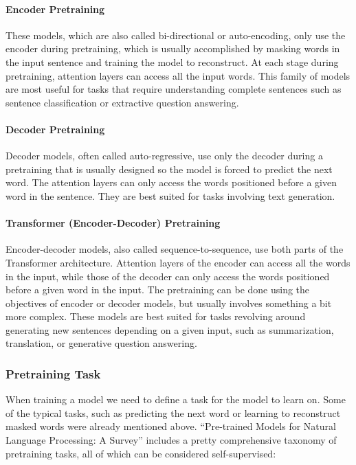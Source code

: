 \documentclass{article}
\begin{document}
\paragraph{Encoder Pretraining}

These models, which are also called bi-directional or auto-encoding, only use the encoder during pretraining, which is usually accomplished by masking words in the input sentence and training the model to reconstruct. At each stage during pretraining, attention layers can access all the input words. This family of models are most useful for tasks that require understanding complete sentences such as sentence classification or extractive question answering.

\paragraph{Decoder Pretraining}

Decoder models, often called auto-regressive, use only the decoder during a pretraining that is usually designed so the model is forced to predict the next word. The attention layers can only access the words positioned before a given word in the sentence. They are best suited for tasks involving text generation.

\paragraph{Transformer (Encoder-Decoder) Pretraining}

Encoder-decoder models, also called sequence-to-sequence, use both parts of the Transformer architecture. Attention layers of the encoder can access all the words in the input, while those of the decoder can only access the words positioned before a given word in the input. The pretraining can be done using the objectives of encoder or decoder models, but usually involves something a bit more complex. These models are best suited for tasks revolving around generating new sentences depending on a given input, such as summarization, translation, or generative question answering.

\subsubsection{Pretraining Task}

When training a model we need to define a task for the model to learn on. Some of the typical tasks, such as predicting the next word or learning to reconstruct masked words were already mentioned above. “Pre-trained Models for Natural Language Processing: A Survey”\cite{qiu2020pre} includes a pretty comprehensive taxonomy of pretraining tasks, all of which can be considered self-supervised:
\end{document}
